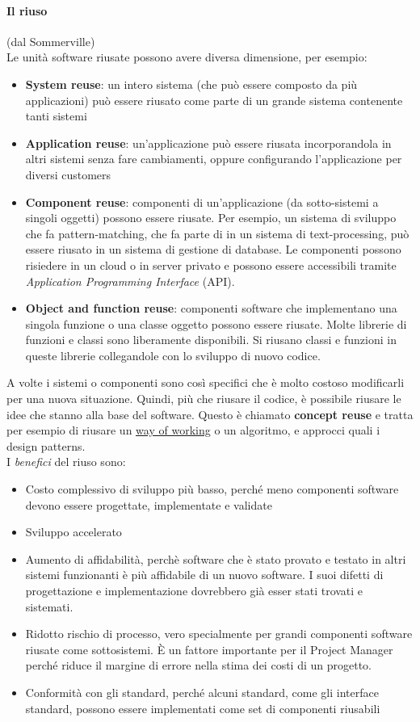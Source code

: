 			\paragraph{Il riuso} (dal Sommerville) \\
			Le unità software riusate possono avere diversa dimensione, per esempio:
			\begin{itemize}
				\item \textbf{System reuse}: un intero sistema (che può essere composto da più applicazioni) può essere riusato come parte di un grande sistema contenente tanti sistemi
				\item \textbf{Application reuse}: un'applicazione può essere riusata incorporandola in altri sistemi senza fare cambiamenti, oppure configurando l'applicazione per diversi customers
				\item \textbf{Component reuse}: componenti di un'applicazione (da sotto-sistemi a singoli oggetti) possono essere riusate. Per esempio, un sistema di sviluppo che fa pattern-matching, che fa parte di in un sistema di text-processing, può essere riusato in un sistema di gestione di database. Le componenti possono risiedere in un cloud o in server privato e possono essere accessibili tramite \textit{Application Programming Interface} (API).
				\item \textbf{Object and function reuse}: componenti software che implementano una singola funzione o una classe oggetto possono essere riusate. Molte librerie di funzioni e classi sono liberamente disponibili. Si riusano classi e funzioni in queste librerie collegandole con lo sviluppo di nuovo codice.
			\end{itemize}
			A volte i sistemi o componenti sono così specifici che è molto costoso modificarli per una nuova situazione. Quindi, più che riusare il codice, è possibile riusare le idee che stanno alla base del software. Questo è chiamato \textbf{concept reuse} e tratta per esempio di riusare un \underline{\hyperref[way]{way of working}} o un algoritmo, e approcci quali i design patterns. \\
			I \textit{benefici} del riuso sono:
			\begin{itemize}
				\item Costo complessivo di sviluppo più basso, perché meno componenti software devono essere progettate, implementate e validate
				\item Sviluppo accelerato
				\item Aumento di affidabilità, perchè software che è stato provato e testato in altri sistemi funzionanti è più affidabile di un nuovo software. I suoi difetti di progettazione e implementazione dovrebbero già esser stati trovati e sistemati.
				\item  Ridotto rischio di processo, vero specialmente per grandi componenti software riusate come sottosistemi. È un fattore importante per il Project Manager perché riduce il margine di errore nella stima dei costi di un progetto.
				\item Conformità con gli standard, perché alcuni standard, come gli interface standard, possono essere implementati come set di componenti riusabili
			\end{itemize}
